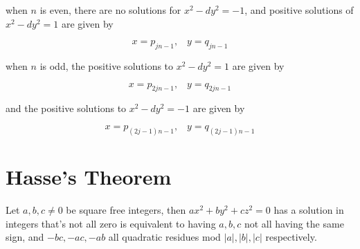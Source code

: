 \documentclass{article}
\begin{document}
\begin{multicols*}{2}
when $n$ is even, there are no solutions for $x^2 - dy^2 = -1$, and positive solutions of $x^2 - dy^2 = 1$ are given by

\[x = p_{jn-1},\;\;\;y = q_{jn-1}\]

when $n$ is odd, the positive solutions to $x^2 - dy^2 = 1$ are given by

\[x = p_{2jn-1},\;\;\;y = q_{2jn-1}\]

and the positive solutions to $x^2 - dy^2 = -1$ are given by

\[x = p_{(2j-1)n-1},\;\;\;y = q_{(2j-1)n-1}\]

\section{Hasse's Theorem}

Let $a,b,c \neq 0$ be square free integers, then $ax^2 + by^2 + cz^2 = 0$ has a solution in integers that's not all zero is equivalent to having $a,b,c$ not all having the same sign, and $-bc,-ac,-ab$ all quadratic residues mod $|a|,|b|,|c|$ respectively.


\end{multicols*}
\end{document}

